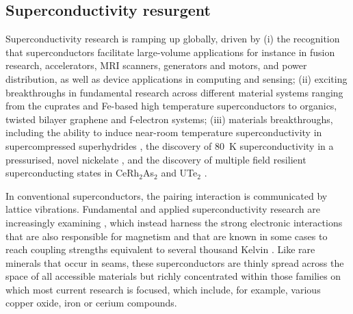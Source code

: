 \twocolumngrid


\subsection*{Superconductivity resurgent}
\noindent
Superconductivity research is ramping up globally, driven by (i) the recognition that superconductors facilitate large-volume applications for instance in fusion research, accelerators, MRI scanners, generators and motors, and power distribution, as well as device applications in computing and sensing; (ii) exciting breakthroughs in fundamental research across different material systems ranging from the cuprates and Fe-based high temperature superconductors to organics, twisted bilayer graphene and f-electron systems; (iii) materials breakthroughs, including the ability to induce near-room temperature superconductivity %
in supercompressed superhydrides \cite{drozdov19,somayazulu19}, the discovery of \SI{80}{\kelvin} superconductivity in a pressurised, novel nickelate \cite{sun23}, and the discovery of multiple field resilient superconducting states in CeRh$_2$As$_2$ \cite{khim21} and UTe$_2$ \cite{aoki19,ran19}. 



In conventional superconductors, the pairing interaction is communicated by lattice vibrations. Fundamental and applied superconductivity research are increasingly examining , which instead harness the {strong electronic interactions} that are also responsible for magnetism and that are
known in some cases to reach coupling strengths equivalent to several
thousand Kelvin \cite{monthoux07,norman11}. Like rare minerals that occur in seams, these superconductors are thinly spread across the space of all accessible materials but richly concentrated within those families on which most current research is focused, which include, for example, various copper oxide, iron or cerium compounds. 

